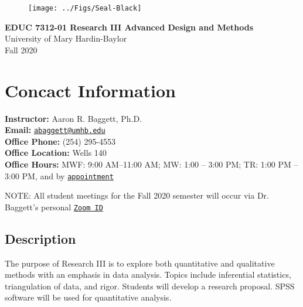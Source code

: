 \documentclass[
]{article}
\author{}
\date{\vspace{-2.5em}}
\begin{document}
\makeatletter
\setlength{\@fptop}{0pt}
\makeatother

\begin{figure}[t!]
  \centering
  \texttt{[image: ../Figs/Seal-Black]}
\end{figure}


\begin{center}
{\LARGE{\bf{EDUC 7312-01 Research III Advanced Design and Methods}}}\\
{\small{University of Mary Hardin-Baylor}}\\
\vspace{.15in}
{\large{Fall 2020}}
\end{center}

\thispagestyle{empty}

\vspace{3mm}

\vspace{.25in}

\section{Concact Information}

\textbf{Instructor:} Aaron R. Baggett, Ph.D.\\
\textbf{Email:}
\texttt{\href{mailto:abaggett@umhb.edu}{abaggett@umhb.edu}}\\
\textbf{Office Phone:} (254) 295-4553\\
\textbf{Office Location:} Wells 140\\
\textbf{Office Hours:} MWF: 9:00 AM--11:00 AM; MW: 1:00 -- 3:00 PM; TR:
1:00 PM -- 3:00 PM, and by
\texttt{\href{mailto:abaggett@umhb.edu}{appointment}}

\begin{tcolorbox}
[width=\linewidth, sharp corners=all, colback=white!95!red]
NOTE: All student meetings for the Fall 2020 semester will occur via Dr. Baggett's personal \texttt{\href{https://umhb.zoom.us/j/5393191651}{Zoom ID}}
\end{tcolorbox}

\subsection{Description}

The purpose of Research III is to explore both quantitative and
qualitative methods with an emphasis in data analysis. Topics include
inferential statistics, triangulation of data, and rigor. Students will
develop a research proposal. SPSS software will be used for quantitative
analysis.
\end{document}
